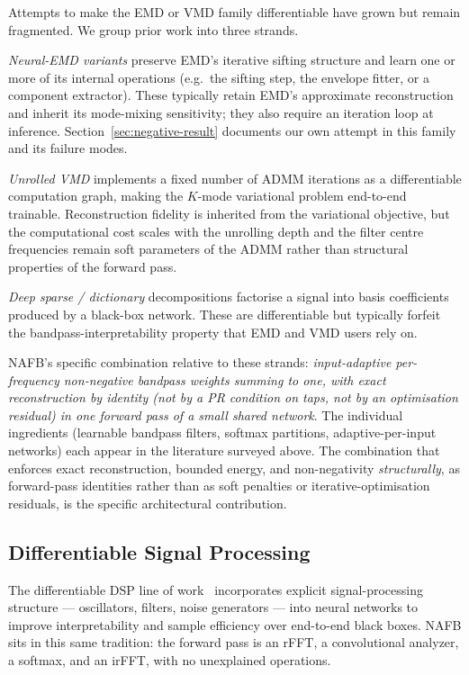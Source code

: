 \documentclass[journal]{IEEEtran}
\theoremstyle{remark}
\begin{document}
Attempts to make the EMD or VMD family differentiable have grown but
remain fragmented. We group prior work into three strands.

\emph{Neural-EMD variants} preserve EMD's iterative sifting structure
and learn one or more of its internal operations (e.g.\ the sifting
step, the envelope fitter, or a component extractor). These typically
retain EMD's approximate reconstruction and inherit its mode-mixing
sensitivity; they also require an iteration loop at inference.
Section~\ref{sec:negative-result} documents our own attempt in this
family and its failure modes.

\emph{Unrolled VMD} implements a fixed number of ADMM iterations as a
differentiable computation graph, making the $K$-mode variational
problem end-to-end trainable. Reconstruction fidelity is inherited
from the variational objective, but the computational cost scales
with the unrolling depth and the filter centre frequencies remain
soft parameters of the ADMM rather than structural properties of the
forward pass.

\emph{Deep sparse / dictionary} decompositions factorise a signal
into basis coefficients produced by a black-box network. These are
differentiable but typically forfeit the bandpass-interpretability
property that EMD and VMD users rely on.

NAFB's specific combination relative to these strands:
\emph{input-adaptive per-frequency non-negative bandpass weights
summing to one, with exact reconstruction by identity (not by a PR
condition on taps, not by an optimisation residual) in one forward
pass of a small shared network}. The individual ingredients
(learnable bandpass filters, softmax partitions, adaptive-per-input
networks) each appear in the literature surveyed above. The
combination that enforces exact reconstruction, bounded energy, and
non-negativity \emph{structurally}, as forward-pass identities rather
than as soft penalties or iterative-optimisation residuals, is the
specific architectural contribution.

\subsection{Differentiable Signal Processing}

The differentiable DSP line of work~\cite{engel2020ddsp} incorporates
explicit signal-processing structure --- oscillators, filters, noise
generators --- into neural networks to improve interpretability and
sample efficiency over end-to-end black boxes. NAFB sits in this same
tradition: the forward pass is an rFFT, a convolutional analyzer, a
softmax, and an irFFT, with no unexplained operations.
\end{document}
